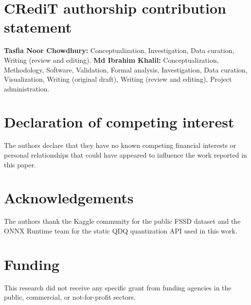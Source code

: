 
\ifdefined\BLIND\else
\section*{CRediT authorship contribution statement}
\textbf{Tasfia Noor Chowdhury:} Conceptualization, Investigation, Data curation, Writing (review and editing).
\textbf{Md Ibrahim Khalil:} Conceptualization, Methodology, Software, Validation, Formal analysis, Investigation, Data curation, Visualization, Writing (original draft), Writing (review and editing), Project administration.

\section*{Declaration of competing interest}
The authors declare that they have no known competing financial interests or personal relationships that could have appeared to influence the work reported in this paper.

\section*{Acknowledgements}
The authors thank the Kaggle community for the public FSSD dataset and the ONNX Runtime team for the static QDQ quantization API used in this work.

\section*{Funding}
This research did not receive any specific grant from funding agencies in the public, commercial, or not-for-profit sectors.

\fi

